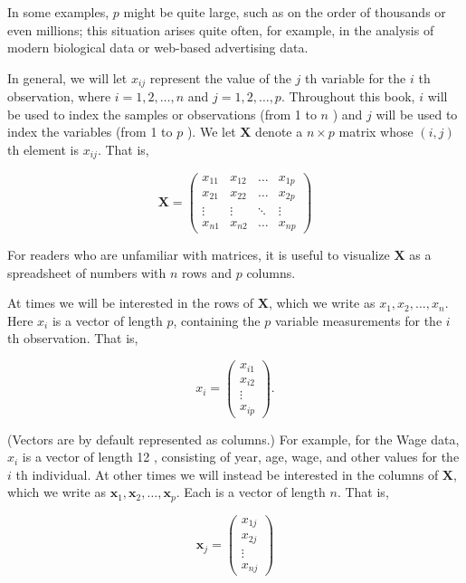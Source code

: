 \documentclass[10pt]{article}
\begin{document}
In some examples, $p$ might be quite large, such as on the order of thousands or even millions; this situation arises quite often, for example, in the analysis of modern biological data or web-based advertising data.

In general, we will let $x_{i j}$ represent the value of the $j$ th variable for the $i$ th observation, where $i=1,2, \ldots, n$ and $j=1,2, \ldots, p$. Throughout this book, $i$ will be used to index the samples or observations (from 1 to $n$ ) and $j$ will be used to index the variables (from 1 to $p$ ). We let $\mathbf{X}$ denote a $n \times p$ matrix whose $(i, j)$ th element is $x_{i j}$. That is,

$$
\mathbf{X}=\left(\begin{array}{cccc}
x_{11} & x_{12} & \ldots & x_{1 p} \\
x_{21} & x_{22} & \ldots & x_{2 p} \\
\vdots & \vdots & \ddots & \vdots \\
x_{n 1} & x_{n 2} & \ldots & x_{n p}
\end{array}\right)
$$

For readers who are unfamiliar with matrices, it is useful to visualize $\mathbf{X}$ as a spreadsheet of numbers with $n$ rows and $p$ columns.

At times we will be interested in the rows of $\mathbf{X}$, which we write as $x_{1}, x_{2}, \ldots, x_{n}$. Here $x_{i}$ is a vector of length $p$, containing the $p$ variable measurements for the $i$ th observation. That is,

\[
x_{i}=\left(\begin{array}{c}
x_{i 1}  \tag{1.1}\\
x_{i 2} \\
\vdots \\
x_{i p}
\end{array}\right) .
\]

(Vectors are by default represented as columns.) For example, for the Wage data, $x_{i}$ is a vector of length 12 , consisting of year, age, wage, and other values for the $i$ th individual. At other times we will instead be interested in the columns of $\mathbf{X}$, which we write as $\mathbf{x}_{1}, \mathbf{x}_{2}, \ldots, \mathbf{x}_{p}$. Each is a vector of length $n$. That is,

$$
\mathbf{x}_{j}=\left(\begin{array}{c}
x_{1 j} \\
x_{2 j} \\
\vdots \\
x_{n j}
\end{array}\right)
$$
\end{document}
